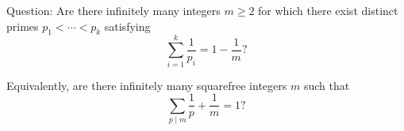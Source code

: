 Question: Are there infinitely many integers $m\ge 2$ for which there exist distinct primes $p_1<\cdots<p_k$ satisfying
\[\sum_{i=1}^k \frac1{p_i}=1-\frac1m?\tag{$\ast$}\]

Equivalently, are there infinitely many squarefree integers $m$ such that
\[\sum_{p\mid m}\frac1p + \frac1m = 1?\tag{$\ast\ast$}\]
